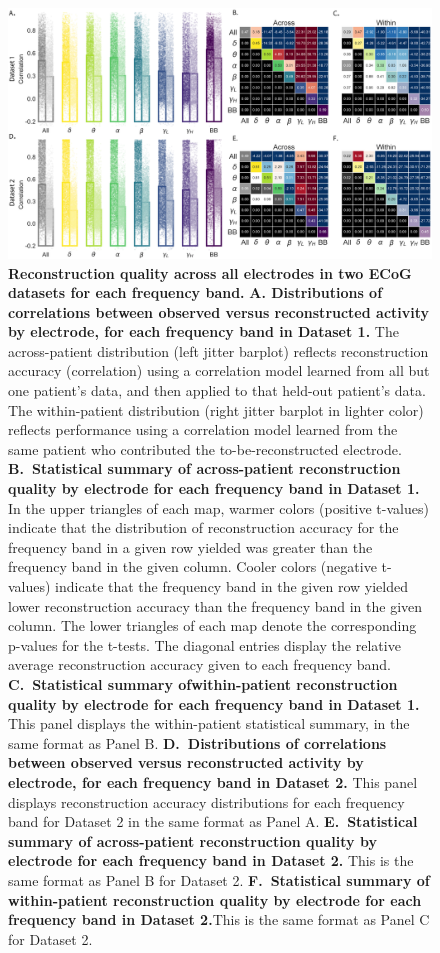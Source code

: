 \documentclass[11pt]{article}
\begin{document}
\begin{figure}
  \centering
  \includegraphics[width=\textwidth]{figs/frequency}
  \caption{\textbf{Reconstruction quality across all electrodes in two
      ECoG datasets for each frequency band.}  \textbf{A. Distributions of correlations
      between observed versus reconstructed activity by electrode, for
      each frequency band in Dataset 1.}  The across-patient
    distribution (left jitter barplot) reflects
    reconstruction accuracy (correlation) using a correlation model
    learned from all but one patient's data, and then applied to that
    held-out patient's data.  The within-patient distribution (right
    jitter barplot in lighter color)
    reflects performance using a correlation model learned from the same
    patient who contributed the to-be-reconstructed electrode.
    \textbf{B.~Statistical summary of across-patient reconstruction
      quality by electrode for each frequency band in Dataset 1.} In the upper triangles of each
    map, warmer colors (positive t-values) indicate that the
    distribution of
    reconstruction accuracy for the frequency band in a given row
    yielded was greater than the frequency band in the given
    column. Cooler colors (negative t-values) indicate that the
    frequency band in the given row yielded lower reconstruction
    accuracy than the frequency band in the given column. The lower
    triangles of each map denote the corresponding p-values for the
    t-tests. The diagonal entries display the relative average
    reconstruction accuracy given to each frequency band. \textbf{C.~Statistical summary ofwithin-patient reconstruction
      quality by electrode for each frequency band in Dataset 1.}
    This panel displays the within-patient statistical summary,
    in the same format as Panel B.  \textbf{D.~Distributions of correlations
      between observed versus reconstructed activity by electrode, for
      each frequency band in Dataset 2.}  This panel displays
    reconstruction accuracy distributions for each frequency band for
    Dataset 2 in
    the same format as Panel A. \textbf{E.~Statistical summary of
      across-patient reconstruction quality by electrode for each
      frequency band in Dataset 2.} This is the same format as Panel
    B for Dataset 2. \textbf{F.~Statistical summary of
      within-patient reconstruction quality by electrode for each
      frequency band in Dataset 2.}This is the same format as Panel
    C for Dataset 2.}
  \label{fig: frequency}
\end{figure}
\end{document}
